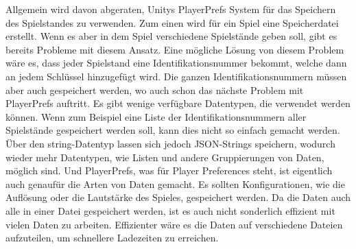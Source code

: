Allgemein wird davon abgeraten, Unitys PlayerPrefs System für das Speichern des Spielstandes zu verwenden. Zum einen wird für ein Spiel eine Speicherdatei erstellt. Wenn es aber in dem Spiel verschiedene Spielstände geben soll, gibt es bereits Probleme mit diesem Ansatz. Eine mögliche Lösung von diesem Problem wäre es, dass jeder Spielstand eine Identifikationsnummer bekommt, welche dann an jedem Schlüssel hinzugefügt wird. Die ganzen Identifikationsnummern müssen aber auch gespeichert werden, wo auch schon das nächste Problem mit PlayerPrefs auftritt. Es gibt wenige verfügbare Datentypen, die verwendet werden können. Wenn zum Beispiel eine Liste der Identifikationsnummern aller Spielstände gespeichert werden soll, kann dies nicht so einfach gemacht werden. Über den string-Datentyp lassen sich jedoch JSON-Strings speichern, wodurch wieder mehr Datentypen, wie Listen und andere Gruppierungen von Daten, möglich sind. Und PlayerPrefs, was für Player Preferences steht, ist eigentlich auch genaufür die Arten von Daten gemacht. Es sollten Konfigurationen, wie die Auflösung oder die Lautstärke des Spieles, gespeichert werden. Da die Daten auch alle in einer Datei gespeichert werden, ist es auch nicht sonderlich effizient mit vielen Daten zu arbeiten. Effizienter wäre es die Daten auf verschiedene Dateien aufzuteilen, um schnellere Ladezeiten zu erreichen.
\cite{logrocketPlayerPrefs}\cite{gamedevbeginnerPlayerPrefs}

